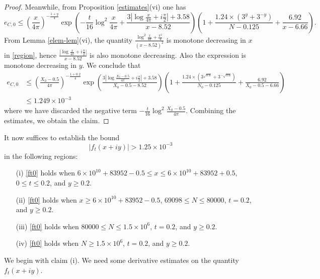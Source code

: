 \begin{proof}
Meanwhile, from Proposition \ref{estimates}(vi) one has
$$ e_{C,0} \leq \left(\frac{x}{4\pi}\right)^{-\frac{1+y}{4}} \exp\left( - \frac{t}{16} \log^2 \frac{x}{4\pi} + \frac{3 |\log \frac{x}{4\pi} + i \frac{\pi}{2}|+3.58}{x-8.52} \right) \left(1 + \frac{1.24 \times (3^y+3^{-y})}{N-0.125} + \frac{6.92}{x-6.66}\right).$$
From Lemma \ref{elem-lem}(vi), the quantity $\frac{\log^2 \frac{x}{4\pi} + \frac{\pi^2}{4}}{(x-8.52)^2}$ is monotone decreasing in $x$ in \eqref{region}, hence $\frac{|\log \frac{x}{4\pi} + i \frac{\pi}{2}|}{x-8.52}$ is also monotone decreasing.  Also the expression is monotone decreasing in $y$. We conclude that
\begin{equation}\label{ec0-bound}
\begin{split}
 e_{C,0} &\leq \left(\frac{X_0-0.5}{4\pi}\right)^{-\frac{1+0.2}{4}} \exp\left( \frac{3 |\log \frac{X_0-0.5}{4\pi} + i \frac{\pi}{2}|+3.58}{X_0-0.5-8.52} \right) \left(1 + \frac{1.24 \times (3^{\sqrt{0.6}}+3^{-\sqrt{0.6}})}{N_0-0.125} + \frac{6.92}{X_0-0.5-6.66}\right) \\
&\leq 1.249 \times 10^{-3}
\end{split}
\end{equation}
where we have discarded the negative term $- \frac{t}{16} \log^2 \frac{X_0-0.5}{4\pi}$.  Combining the estimates, we obtain the claim.
\end{proof}


It now suffices to establish the bound
\begin{equation}\label{ft0}
 |f_t(x+iy)| > 1.25 \times 10^{-3}
\end{equation}
in the following regions:

\begin{itemize}
\item[(i)]  \eqref{ft0} holds when $6 \times 10^{10} + 83952 - 0.5 \leq x \leq 6 \times 10^{10} + 83952 + 0.5$, $0 \leq t \leq 0.2$, and $y \geq 0.2$.
\item[(ii)]  \eqref{ft0} holds when $x \geq 6 \times 10^{10} + 83952 - 0.5$, $69098 \leq N \leq 80000$, $t = 0.2$, and $y \geq 0.2$.
\item[(iii)]  \eqref{ft0} holds when $80000 \leq N \leq 1.5 \times 10^6$, $t = 0.2$, and $y \geq 0.2$.
\item[(iv)]  \eqref{ft0} holds when $N \geq 1.5 \times 10^6$, $t = 0.2$, and $y \geq 0.2$.
\end{itemize}


We begin with claim (i).  We need some derivative estimates on the quantity $f_t(x+iy )$.

